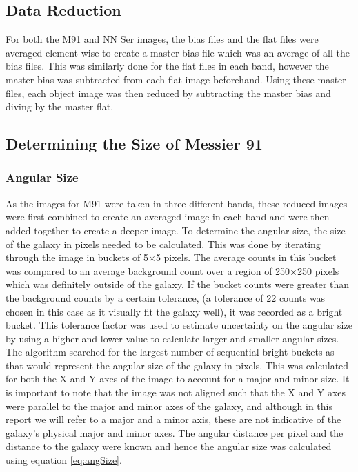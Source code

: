 \documentclass[%
reprint,
amsmath,amssymb,
aps,
]{revtex4-2}
\begin{document}
		\subsection{Data Reduction}
			
			 For both the M91 and NN Ser images, the bias files and the flat files were averaged element-wise to create a master bias file which was an average of all the bias files. This was similarly done for the flat files in each band, however the master bias was subtracted from each flat image beforehand. Using these master files, each object image was then reduced by subtracting the master bias and diving by the master flat.
		
		\subsection{Determining the Size of Messier 91}
			
			\subsubsection{Angular Size}
			
				As the images for M91 were taken in three different bands, these reduced images were first combined to create an averaged image in each band and were then added together to create a deeper image. To determine the angular size, the size of the galaxy in pixels needed to be calculated. This was done by iterating through the image in buckets of 5$\times$5 pixels. The average counts in this bucket was compared to an average background count over a region of 250$\times$250 pixels which was definitely outside of the galaxy. If the bucket counts were greater than the background counts by a certain tolerance, (a tolerance of 22 counts was chosen in this case as it visually fit the galaxy well), it was recorded as a bright bucket. This tolerance factor was used to estimate uncertainty on the angular size by using a higher and lower value to calculate larger and smaller angular sizes.\\
				
				The algorithm searched for the largest number of sequential bright buckets as that would represent the angular size of the galaxy in pixels. This was calculated for both the X and Y axes of the image to account for a major and minor size. It is important to note that the image was not aligned such that the X and Y axes were parallel to the major and minor axes of the galaxy, and although in this report we will refer to a major and a minor axis, these are not indicative of the galaxy's physical major and minor axes. The angular distance per pixel and the distance to the galaxy were known and hence the angular size was calculated using equation \ref{eq:angSize}.
			
\end{document}
